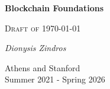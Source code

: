 \makeatletter
\def\@primarycover[#1][#2]{
 \begin{titlepage}
  \centering
  {\huge\bfseries Blockchain Foundations\par}
  \vspace{2cm}
  {\Large \color{red} \textsc{Draft of \today}\par}
  \vspace{2cm}
  {\Large\itshape Dionysis
                  Zindros\par}
  \vfill
  {\large Athens and Stanford\\
          \vspace{1cm}
          #1\\
          #2\par
          }
 \end{titlepage}
}
\@primarycover[Summer 2021 - Spring 2026][]
\makeatother
\thispagestyle{empty}\newpage
